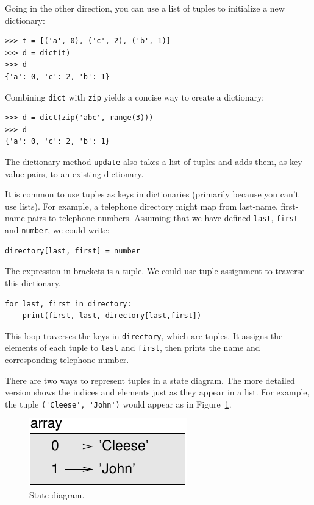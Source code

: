 \documentclass[10pt]{book}
\begin{document}
Going in the other direction, you can use a list of tuples to
initialize a new dictionary: 

\begin{verbatim}
>>> t = [('a', 0), ('c', 2), ('b', 1)]
>>> d = dict(t)
>>> d
{'a': 0, 'c': 2, 'b': 1}
\end{verbatim}

Combining {\tt dict} with {\tt zip} yields a concise way
to create a dictionary:

\begin{verbatim}
>>> d = dict(zip('abc', range(3)))
>>> d
{'a': 0, 'c': 2, 'b': 1}
\end{verbatim}
%
The dictionary method {\tt update} also takes a list of tuples
and adds them, as key-value pairs, to an existing dictionary.

It is common to use tuples as keys in dictionaries (primarily because
you can't use lists).  For example, a telephone directory might map
from last-name, first-name pairs to telephone numbers.  Assuming
that we have defined {\tt last}, {\tt first} and {\tt number}, we
could write:

\begin{verbatim}
directory[last, first] = number
\end{verbatim}
%
The expression in brackets is a tuple.  We could use tuple
assignment to traverse this dictionary.

\begin{verbatim}
for last, first in directory:
    print(first, last, directory[last,first])
\end{verbatim}
%
This loop traverses the keys in {\tt directory}, which are tuples.  It
assigns the elements of each tuple to {\tt last} and {\tt first}, then
prints the name and corresponding telephone number.

There are two ways to represent tuples in a state diagram.  The more
detailed version shows the indices and elements just as they appear in
a list.  For example, the tuple \verb"('Cleese', 'John')" would appear
as in Figure~\ref{fig.tuple1}.

\begin{figure}
\centerline
{\includegraphics[scale=0.8]{figs/tuple1.pdf}}
\caption{State diagram.}
\label{fig.tuple1}
\end{figure}
\end{document}
